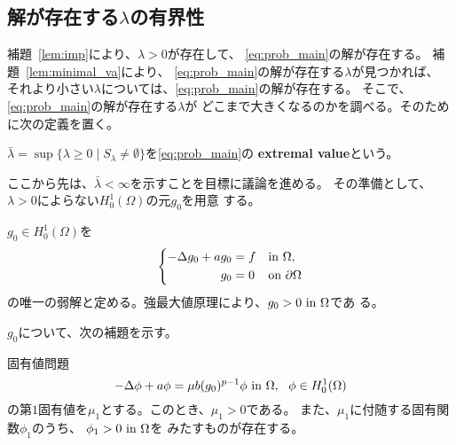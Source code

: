 \subsection{解が存在する$\lambda$の有界性}

補題~\ref{lem:imp}により、$\lambda > 0$が存在して、
\ref{eq:prob_main}の解が存在する。
補題~\ref{lem:minimal_va}により、
\ref{eq:prob_main}の解が存在する$\lambda$が見つかれば、
それより小さい$\lambda$については、\ref{eq:prob_main}の解が存在する。
そこで、\ref{eq:prob_main}の解が存在する$\lambda$が
どこまで大きくなるのかを調べる。そのために次の定義を置く。

\begin{defn} \label{defn:ext}
 $\bar{\lambda} = \sup \{ \lambda \geq 0 \mid S_\lambda \neq \emptyset
 \}$を\ref{eq:prob_main}の {\bf extremal value}という。
\end{defn}

ここから先は、$\bar{\lambda} < \infty$を示すことを目標に議論を進める。
その準備として、$\lambda > 0$によらない$H_0^1(\Omega)$の元$g_0$を用意
する。

\begin{nota} \label{nota:g_0}
 $g_0 \in H_0^1(\Omega)$を
 \begin{align}
  \left\{
  \begin{aligned}
   -\Delta g_0 + a g_0 
    &= f  & &\text{in}~ \Omega,  \\
   g_0 &= 0 & &\text{on}~ \partial\Omega
  \end{aligned}
  \right. \label{eq:g_0}
 \end{align}
 の唯一の弱解と定める。強最大値原理により、$g_0 > 0 ~\text{in}~ \Omega$であ
 る。
\end{nota}
 
$g_0$について、次の補題を示す。

\begin{lem} \label{lem:g_0}
 固有値問題
 \[
  -\Delta \phi + a \phi = \mu b (g_0)^{p-1}\phi ~\text{in}~ \Omega, \ \
 \phi \in H_0^1(\Omega)
 \]
 の第$1$固有値を$\mu_1$とする。このとき、$\mu_1 > 0$である。
 また、$\mu_1$に付随する固有関数$\phi_1$のうち、
 $\phi_1 > 0 ~\text{in}~ \Omega$を
 みたすものが存在する。
\end{lem}

